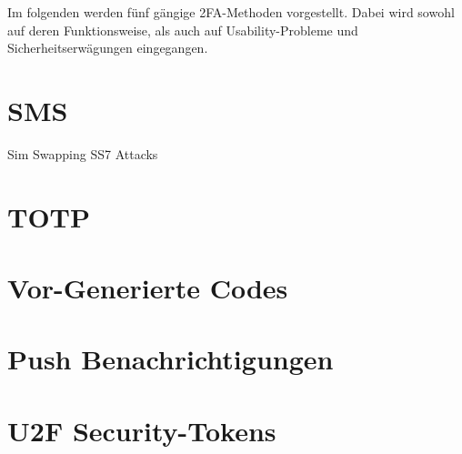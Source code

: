 \pskip
Im folgenden werden fünf gängige \ac{2FA}-Methoden vorgestellt. Dabei wird sowohl auf deren Funktionsweise, als auch auf Usability-Probleme und Sicherheitserwägungen eingegangen.

\section{SMS}
Sim Swapping
SS7 Attacks
\section{TOTP}
\section{Vor-Generierte Codes}
\section{Push Benachrichtigungen}
\section{U2F Security-Tokens}
